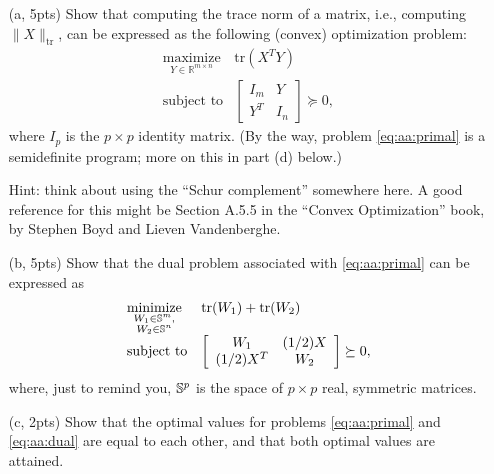 \documentclass{article}
\theoremstyle{remark}
\theoremstyle{definition}
\newcommand{\minimize}{\mathop{\mathrm{minimize}}}
\newcommand{\maximize}{\mathop{\mathrm{maximize}}}
\newcommand{\minimizewrt}[1]{\underset{#1}{\minimize}}
\newcommand{\maximizewrt}[1]{\underset{#1}{\maximize}}
\newcommand{\subjectto}{\mbox{subject to}}
\def\tr{\mathrm{tr}}
\begin{document}
\begin{enumerate}
\item[(a, 5pts)]
Show that computing the trace norm of a matrix, i.e., computing $\| X \|_{\tr}$, can be expressed as the following (convex) optimization problem:
\begin{equation}
\begin{array}{ll}
\maximizewrt{Y \in \mathbb{R}^{m \times n}} & \tr(X^T Y) \\
\subjectto & 
\left[
\begin{array}{cc}
I_m & Y \\
Y^T & I_n
\end{array}
\right]
\succeq 0,
\end{array}
\label{eq:aa:primal}
\end{equation}
where $I_p$ is the $p \times p$ identity matrix.  (By the way, problem \eqref{eq:aa:primal} is a semidefinite program; more on this in part (d) below.)

Hint: think about using the ``Schur complement'' somewhere here.  A good reference for this might be Section A.5.5 in the ``Convex Optimization'' book, by Stephen Boyd and Lieven Vandenberghe.

\item[(b, 5pts)]
Show that the dual problem associated with \eqref{eq:aa:primal} can be expressed as
\begin{equation}
\begin{array}{ll}
\minimizewrt{\substack{W_{1} \in \symm^{m}, \\ W_{2} \in \symm^{n}}} & \tr(W_{1}) + \tr(W_{2}) \\
\subjectto & 
\left[
\begin{array}{cc}
W_{1} & (1/2) X \\
(1/2) X^T & W_{2}
\end{array}
\right]
\succeq 0,
\end{array}
\label{eq:aa:dual}
\end{equation}
where, just to remind you, $\mathbb{S}^p$ is the space of $p \times p$ real, symmetric matrices.

\item[(c, 2pts)]
Show that the optimal values for problems \eqref{eq:aa:primal} and \eqref{eq:aa:dual} are equal to each other, and that both optimal values are attained.


\end{enumerate}
\end{document}
